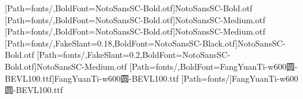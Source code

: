 [Path=fonts/,BoldFont=NotoSansSC-Bold.otf]{NotoSansSC-Bold.otf}
[Path=fonts/,BoldFont=NotoSansSC-Bold.otf]{NotoSansSC-Medium.otf}
[Path=fonts/,BoldFont=NotoSansSC-Bold.otf]{NotoSansSC-Medium.otf}
[Path=fonts/,FakeSlant=0.18,BoldFont=NotoSansSC-Black.otf]{NotoSansSC-Bold.otf}
[Path=fonts/,FakeSlant=0.2,BoldFont=NotoSansSC-Bold.otf]{NotoSansSC-Medium.otf}
[Path=fonts/,BoldFont=FangYuanTi-w600圆-BEVL100.ttf]{FangYuanTi-w600圆-BEVL100.ttf}
\newfontfamily{\lilat}[Path=fonts/]{FangYuanTi-w600圆-BEVL100.ttf}
\newcommand{\heiti}{\CJKfamily{hei}}
\newcommand{\heizhang}{\CJKfamily{heizhang}}
\newcommand{\heijie}{\CJKfamily{heijie}}
\newcommand{\heitiao}{\CJKfamily{heitiao}}
\newcommand{\heibf}{\CJKfamily{heibf}}
\newcommand{\heihao}{\CJKfamily{heihao}}
\newcommand{\heibian}{\CJKfamily{heibian}}
\newcommand{\huabf}{\CJKfamily{huabf}}
\newcommand{\lihei}{\CJKfamily{lihei}}
\newcommand{\kaishu}{\CJKfamily{kai}}
\newcommand{\fangsong}{\CJKfamily{fangsong}}%
